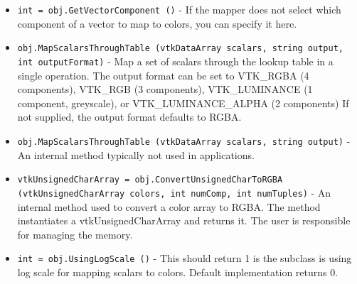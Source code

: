 \begin{itemize}
\item  \verb|int = obj.GetVectorComponent ()| -  If the mapper does not select which component of a vector
 to map to colors, you can specify it here.

\item  \verb|obj.MapScalarsThroughTable (vtkDataArray scalars, string output, int outputFormat)| -  Map a set of scalars through the lookup table in a single operation. 
 The output format can be set to VTK\_RGBA (4 components), 
 VTK\_RGB (3 components), VTK\_LUMINANCE (1 component, greyscale),
 or VTK\_LUMINANCE\_ALPHA (2 components)
 If not supplied, the output format defaults to RGBA.

\item  \verb|obj.MapScalarsThroughTable (vtkDataArray scalars, string output)| -  An internal method typically not used in applications.

\item  \verb|vtkUnsignedCharArray = obj.ConvertUnsignedCharToRGBA (vtkUnsignedCharArray colors, int numComp, int numTuples)| -  An internal method used to convert a color array to RGBA. The
 method instantiates a vtkUnsignedCharArray and returns it. The user is
 responsible for managing the memory.

\item  \verb|int = obj.UsingLogScale ()| -  This should return 1 is the subclass is using log scale for mapping scalars
 to colors. Default implementation returns 0.

\end{itemize}
